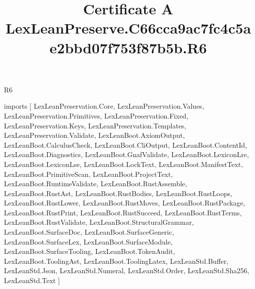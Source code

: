 \begin{lexlean}{R6}
\title{Certificate A LexLeanPreserve.C66cca9ac7fc4c5ae2bbd07f753f87b5b.R6}
\begin{coremodule}
imports [
  LexLeanPreservation.Core,
  LexLeanPreservation.Values,
  LexLeanPreservation.Primitives,
  LexLeanPreservation.Fixed,
  LexLeanPreservation.Keys,
  LexLeanPreservation.Templates,
  LexLeanPreservation.Validate,
  LexLeanBoot.AxiomOutput,
  LexLeanBoot.CalculusCheck,
  LexLeanBoot.CliOutput,
  LexLeanBoot.ContentId,
  LexLeanBoot.Diagnostics,
  LexLeanBoot.GnafValidate,
  LexLeanBoot.LexiconLre,
  LexLeanBoot.LexiconLse,
  LexLeanBoot.LockText,
  LexLeanBoot.ManifestText,
  LexLeanBoot.PrimitiveScan,
  LexLeanBoot.ProjectText,
  LexLeanBoot.RuntimeValidate,
  LexLeanBoot.RustAssemble,
  LexLeanBoot.RustAst,
  LexLeanBoot.RustBodies,
  LexLeanBoot.RustLoops,
  LexLeanBoot.RustLower,
  LexLeanBoot.RustMoves,
  LexLeanBoot.RustPackage,
  LexLeanBoot.RustPrint,
  LexLeanBoot.RustSucceed,
  LexLeanBoot.RustTerms,
  LexLeanBoot.RustValidate,
  LexLeanBoot.StructuralGrammar,
  LexLeanBoot.SurfaceDoc,
  LexLeanBoot.SurfaceGeneric,
  LexLeanBoot.SurfaceLex,
  LexLeanBoot.SurfaceModule,
  LexLeanBoot.SurfaceTooling,
  LexLeanBoot.TokenAudit,
  LexLeanBoot.ToolingAst,
  LexLeanBoot.ToolingLatex,
  LexLeanStd.Buffer,
  LexLeanStd.Json,
  LexLeanStd.Numeral,
  LexLeanStd.Order,
  LexLeanStd.Sha256,
  LexLeanStd.Text
]


\end{coremodule}
\end{lexlean}
